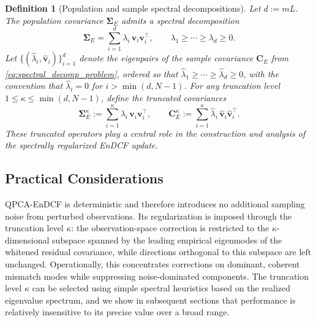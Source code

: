\documentclass[11pt,a4paper]{article}
\newtheorem{definition}{Definition}
\begin{document}
\begin{definition}[Population and sample spectral decompositions]
\label{def:spectral_decompositions}
Let $d:=mL$. The population covariance $\boldsymbol{\Sigma}_E$ admits a spectral decomposition
\begin{equation}
\boldsymbol{\Sigma}_E
=
\sum_{i=1}^{d}\lambda_i\,\mathbf{v}_i\mathbf{v}_i^\top,
\qquad
\lambda_1\ge\cdots\ge\lambda_d\ge 0.
\end{equation}
Let $\{(\hat{\lambda}_i,\hat{\mathbf{v}}_i)\}_{i=1}^{d}$ denote the eigenpairs of the sample covariance $\mathbf{C}_E$ from \eqref{eq:spectral_decomp_problem}, ordered so that $\hat{\lambda}_1\ge\cdots\ge\hat{\lambda}_d\ge 0$, with the convention that $\hat{\lambda}_i=0$ for $i>\min(d,N{-}1)$. For any truncation level $1\le\kappa\le \min(d,N-1)$, define the truncated covariances
\begin{equation}
\boldsymbol{\Sigma}_E^{\kappa}
:=
\sum_{i=1}^{\kappa}\lambda_i\,\mathbf{v}_i\mathbf{v}_i^\top,
\qquad
\mathbf{C}_E^{\kappa}
:=
\sum_{i=1}^{\kappa}\hat{\lambda}_i\,\hat{\mathbf{v}}_i\hat{\mathbf{v}}_i^\top.
\end{equation}
These truncated operators play a central role in the construction and analysis of the spectrally regularized EnDCF update.
\end{definition}



\subsection{Practical Considerations}
\label{subsec:practical_considerations}

QPCA-EnDCF is deterministic and therefore introduces no additional sampling noise from perturbed observations. Its regularization is imposed through the truncation level $\kappa$: the observation-space correction is restricted to the $\kappa$-dimensional subspace spanned by the leading empirical eigenmodes of the whitened residual covariance, while directions orthogonal to this subspace are left unchanged. Operationally, this concentrates corrections on dominant, coherent mismatch modes while suppressing noise-dominated components. The truncation level $\kappa$ can be selected using simple spectral heuristics based on the realized eigenvalue spectrum, and we show in subsequent sections that performance is relatively insensitive to its precise value over a broad range.
\end{document}
